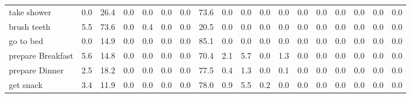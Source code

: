 \documentclass{article}
\begin{document}
\begin{sideways}
\begin{tabular}{lrrrrrrrrrrrrrrrrr}
take shower                   &         0.0 &               26.4 &           0.0 &               0.0 &                0.0 &                0.0 &             73.6 &                      0.0 &                   0.0 &              0.0 &              0.0 &                            0.0 &                      0.0 &                    0.0 &                                  0.0 &                          0.0 &                  0.0 \\
brush teeth                   &         5.5 &               73.6 &           0.0 &               0.4 &                0.0 &                0.0 &             20.5 &                      0.0 &                   0.0 &              0.0 &              0.0 &                            0.0 &                      0.0 &                    0.0 &                                  0.0 &                          0.0 &                  0.0 \\
go to bed                     &         0.0 &               14.9 &           0.0 &               0.0 &                0.0 &                0.0 &             85.1 &                      0.0 &                   0.0 &              0.0 &              0.0 &                            0.0 &                      0.0 &                    0.0 &                                  0.0 &                          0.0 &                  0.0 \\
prepare Breakfast             &         5.6 &               14.8 &           0.0 &               0.0 &                0.0 &                0.0 &             70.4 &                      2.1 &                   5.7 &              0.0 &              1.3 &                            0.0 &                      0.0 &                    0.0 &                                  0.0 &                          0.0 &                  0.0 \\
prepare Dinner                &         2.5 &               18.2 &           0.0 &               0.0 &                0.0 &                0.0 &             77.5 &                      0.4 &                   1.3 &              0.0 &              0.1 &                            0.0 &                      0.0 &                    0.0 &                                  0.0 &                          0.0 &                  0.0 \\
get snack                     &         3.4 &               11.9 &           0.0 &               0.0 &                0.0 &                0.0 &             78.0 &                      0.9 &                   5.5 &              0.2 &              0.0 &                            0.0 &                      0.0 &                    0.0 &                                  0.0 &                          0.0 &                  0.0 \\

\end{tabular}
\end{sideways}
\end{document}
